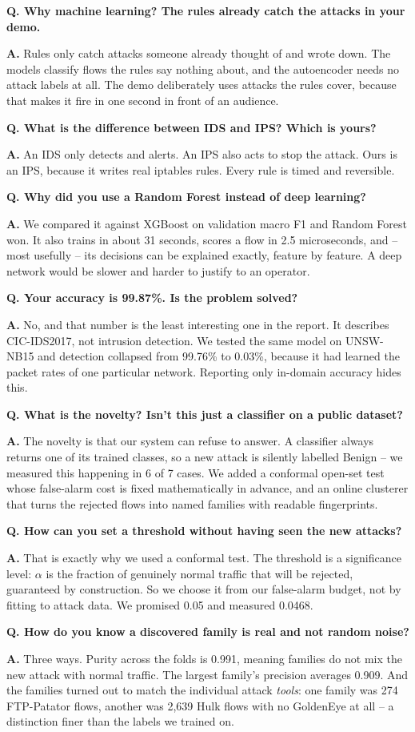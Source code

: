 \documentclass[11pt,a4paper]{article}
\newcommand{\qa}[2]{\par\medskip\noindent\textbf{Q. #1}\par\nobreak\vspace{1pt}\textbf{\color{good}A.} #2\par}
\begin{document}
\qa{Why machine learning? The rules already catch the attacks in your demo.}
{Rules only catch attacks someone already thought of and wrote down. The models
classify flows the rules say nothing about, and the autoencoder needs no attack
labels at all. The demo deliberately uses attacks the rules cover, because that
makes it fire in one second in front of an audience.}

\qa{What is the difference between IDS and IPS? Which is yours?}
{An IDS only detects and alerts. An IPS also acts to stop the attack. Ours is an
IPS, because it writes real iptables rules. Every rule is timed and reversible.}

\qa{Why did you use a Random Forest instead of deep learning?}
{We compared it against XGBoost on validation macro F1 and Random Forest won. It
also trains in about 31 seconds, scores a flow in 2.5 microseconds, and -- most
usefully -- its decisions can be explained exactly, feature by feature. A deep
network would be slower and harder to justify to an operator.}

\qa{Your accuracy is 99.87\%. Is the problem solved?}
{No, and that number is the least interesting one in the report. It describes
CIC-IDS2017, not intrusion detection. We tested the same model on UNSW-NB15 and
detection collapsed from 99.76\% to 0.03\%, because it had learned the packet
rates of one particular network. Reporting only in-domain accuracy hides this.}

\qa{What is the novelty? Isn't this just a classifier on a public dataset?}
{The novelty is that our system can refuse to answer. A classifier always returns
one of its trained classes, so a new attack is silently labelled Benign -- we
measured this happening in 6 of 7 cases. We added a conformal open-set test whose
false-alarm cost is fixed mathematically in advance, and an online clusterer that
turns the rejected flows into named families with readable fingerprints.}

\qa{How can you set a threshold without having seen the new attacks?}
{That is exactly why we used a conformal test. The threshold is a significance
level: $\alpha$ is the fraction of genuinely normal traffic that will be rejected,
guaranteed by construction. So we choose it from our false-alarm budget, not by
fitting to attack data. We promised 0.05 and measured 0.0468.}

\qa{How do you know a discovered family is real and not random noise?}
{Three ways. Purity across the folds is 0.991, meaning families do not mix the new
attack with normal traffic. The largest family's precision averages 0.909. And the
families turned out to match the individual attack \emph{tools}: one family was
274 FTP-Patator flows, another was 2,639 Hulk flows with no GoldenEye at all --
a distinction finer than the labels we trained on.}
\end{document}
